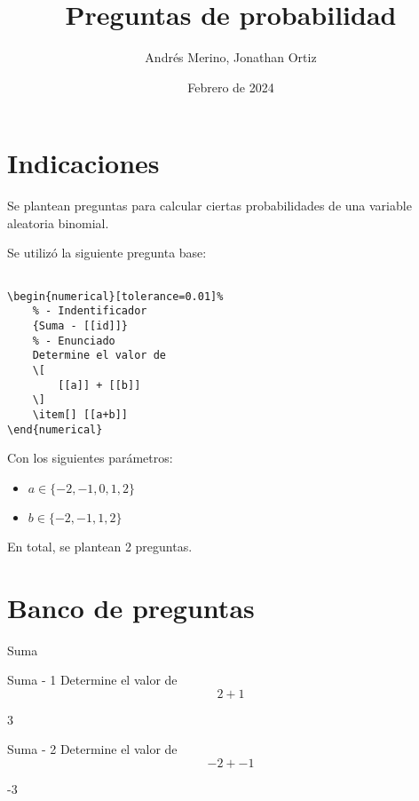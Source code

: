 \documentclass[a4,11pt]{article}
\title{Preguntas de probabilidad}
\author{Andrés Merino, Jonathan Ortiz}
\date{Febrero de 2024}
\begin{document}
\maketitle

\section{Indicaciones}

Se plantean preguntas para calcular ciertas probabilidades de una variable aleatoria binomial.



Se utilizó la siguiente pregunta base:
\begin{lstlisting}[breaklines]

\begin{numerical}[tolerance=0.01]%
    % - Indentificador
    {Suma - [[id]]}
    % - Enunciado
    Determine el valor de 
    \[
        [[a]] + [[b]]
    \]
    \item[] [[a+b]]
\end{numerical}

\end{lstlisting}
\noindent
Con los siguientes parámetros:
\begin{itemize}
	\item $a \in \{-2, -1, 0, 1, 2\}$
	\item $b \in \{-2, -1, 1, 2\}$

\end{itemize}
En total, se plantean 2 preguntas.


\section{Banco de preguntas}

\begin{quiz}{Suma}

\begin{numerical}[tolerance=0.01]%
    {Suma - 1}
    Determine el valor de 
    \[
        2 + 1
    \]
    \item[] 3
\end{numerical}

\begin{numerical}[tolerance=0.01]%
    {Suma - 2}
    Determine el valor de 
    \[
        -2 + -1
    \]
    \item[] -3
\end{numerical}




\end{quiz}
\end{document}
